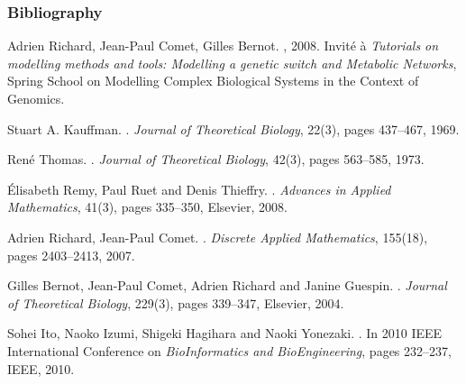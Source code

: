 
\begin{frame}[c]
  \frametitle{Bibliography}

\small
\setlength{\parindent}{-1em}
\setlength{\parskip}{0.5em}

\tcitebullet Adrien Richard, Jean-Paul Comet, Gilles Bernot.
, 2008.
Invité à \textit{Tutorials on modelling methods and tools: Modelling a genetic switch and Metabolic Networks}, Spring School on Modelling Complex Biological Systems in the Context of Genomics.

\tcitebullet Stuart A. Kauffman.
.
\textit{Journal of Theoretical Biology}, 22(3), pages 437--467, 1969.

\tcitebullet René Thomas.
.
\textit{Journal of Theoretical Biology}, 42(3), pages 563--585, 1973.

\tcitebullet Élisabeth Remy, Paul Ruet and Denis Thieffry.
.
\textit{Advances in Applied Mathematics}, 41(3), pages 335--350, Elsevier, 2008.

\tcitebullet Adrien Richard, Jean-Paul Comet.
.
\textit{Discrete Applied Mathematics}, 155(18), pages 2403--2413, 2007.

\tcitebullet Gilles Bernot, Jean-Paul Comet, Adrien Richard and Janine Guespin.
.
\textit{Journal of Theoretical Biology}, 229(3), pages 339--347, Elsevier, 2004.

\tcitebullet Sohei Ito, Naoko Izumi, Shigeki Hagihara and Naoki Yonezaki.
.
In 2010 IEEE International Conference on \textit{BioInformatics and BioEngineering}, pages 232--237, IEEE, 2010.

\end{frame}



